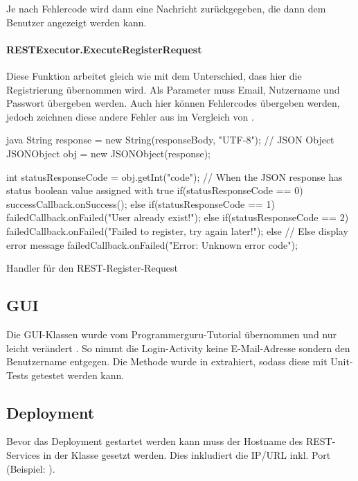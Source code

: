 Je nach Fehlercode wird dann eine Nachricht zurückgegeben, die dann dem Benutzer angezeigt werden kann.

\paragraph{RESTExecutor.ExecuteRegisterRequest}
Diese Funktion arbeitet gleich wie  mit dem Unterschied, dass hier die Registrierung übernommen wird. Als Parameter muss Email, Nutzername und Passwort übergeben werden. Auch hier können Fehlercodes übergeben werden, jedoch zeichnen diese andere Fehler aus im Vergleich von .

\begin{listing}
\begin{code}{java}
String response = new String(responseBody, "UTF-8");
// JSON Object
JSONObject obj = new JSONObject(response);

int statusResponseCode = obj.getInt("code");
// When the JSON response has status boolean value assigned with true
if(statusResponseCode == 0){
    successCallback.onSuccess();
} else if(statusResponseCode == 1) {
    failedCallback.onFailed("User already exist!");
} else if(statusResponseCode == 2) {
    failedCallback.onFailed("Failed to register, try again later!");
} else { // Else display error message
    failedCallback.onFailed("Error: Unknown error code");
}

\end{code}
\caption{Handler für den REST-Register-Request}
\end{listing}


\subsection{GUI}
Die GUI-Klassen wurde vom Programmerguru-Tutorial übernommen und nur leicht verändert \cite{programmerguru-online}. So nimmt die Login-Activity keine E-Mail-Adresse sondern den Benutzername entgegen. Die Methode  wurde in  extrahiert, sodass diese mit Unit-Tests getestet werden kann. 
  

\subsection{Deployment}
Bevor das Deployment gestartet werden kann muss der Hostname des REST-Services in der Klasse  gesetzt werden. Dies inkludiert die IP/URL inkl. Port \newline(Beispiel: ).

